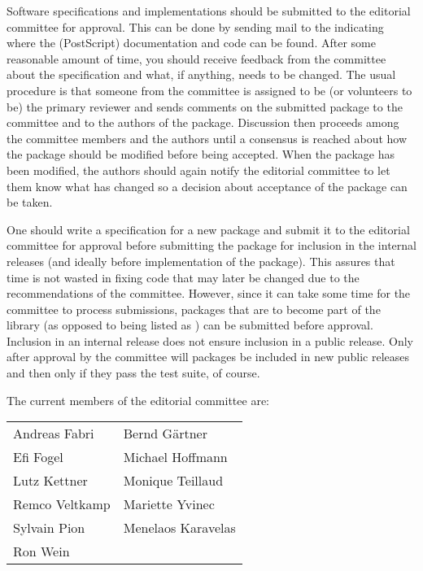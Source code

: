 Software specifications and implementations should be submitted to the
editorial committee for approval.  This can be done by sending mail to
the 
 indicating
where the (PostScript) documentation and code can be found.  After
some reasonable amount of time, you should receive feedback from
the committee about the specification and what, if anything, needs to
be changed. The usual procedure is that someone from the committee is
assigned to be (or volunteers to be) the primary reviewer and sends
comments on the submitted package to the committee and to the authors of
the package.  Discussion then proceeds among the committee members and the
authors until a consensus is reached about how the package should be
modified before being accepted.  When the package has been modified,
the authors should again notify the editorial committee to let them
know what has changed so a decision about acceptance of the package
can be taken.


One should write a specification for a new package
and submit it to the editorial committee for
approval before submitting the package for inclusion in the internal
releases (and ideally before implementation of the package).  This
assures that time is not wasted in fixing code that may later be changed
due to the recommendations of the committee.
However, since it can take some time for the committee to process
submissions, packages that are to become part of the library
(as opposed to being listed as
)
can be submitted
 before approval.
Inclusion in an internal release does not ensure inclusion in a public
release.  Only after approval by the committee will packages be included in new
public releases and then only if they pass the test suite, of course.

The current members of the editorial committee are:
\begin{center}
\begin{tabular}{p{5cm}p{5cm}}
Andreas Fabri          & Bernd G\"artner  \\
Efi Fogel              & Michael Hoffmann \\
Lutz Kettner           & Monique Teillaud  \\
Remco Veltkamp         & Mariette Yvinec  \\
Sylvain Pion           & Menelaos Karavelas\\
Ron Wein
\end{tabular}
\end{center}

